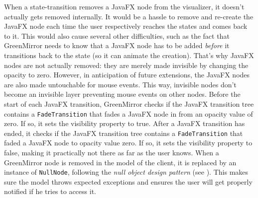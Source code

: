 \documentclass[a4paper]{article}
\begin{document}
When a state-transition removes a JavaFX node from the visualizer, it doesn't actually gets removed internally. It would be a hassle to remove and re-create the JavaFX node each time the user respectively reaches the states and comes back to it. This would also cause several other difficulties, such as the fact that GreenMirror needs to know that a JavaFX node has to be added \emph{before} it transitions back to the state (so it can animate the creation). That's why JavaFX nodes are not actually removed: they are merely made invisible by changing the opacity to zero. However, in anticipation of future extensions, the JavaFX nodes are also made untouchable for mouse events. This way, invisible nodes don't become an invisible layer preventing mouse events on other nodes. Before the start of each JavaFX transition, GreenMirror checks if the JavaFX transition tree contains a \lstinline{FadeTransition} that fades a JavaFX node in from an opacity value of zero. If so, it sets the visibility property to true. After a JavaFX transition has ended, it checks if the JavaFX transition tree contains a \lstinline{FadeTransition} that faded a JavaFX node to opacity value zero. If so, it sets the visibility property to false, making it practically not there as far as the user knows.
When a GreenMirror node is removed in the model of the client, it is replaced by an instance of \lstinline{NullNode}, following the \emph{null object design pattern} (see \cite{kuchana2004,sourcemaking}). This makes sure the model throws expected exceptions and ensures the user will get properly notified if he tries to access it.
\end{document}
